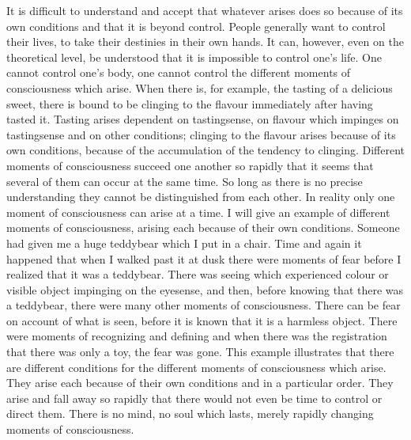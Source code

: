 \documentclass{book}
\begin{document}
It is difficult to understand and accept that whatever arises does so
because of its own conditions and that it is beyond control. People
generally want to control their lives, to take their destinies in their
own hands. It can, however, even on the theoretical level, be understood
that it is impossible to control one's life. One cannot control one's
body, one cannot control the different moments of consciousness which
arise. When there is, for example, the tasting of a delicious sweet,
there is bound to be clinging to the flavour immediately after having
tasted it. Tasting arises dependent on tastingsense, on flavour which
impinges on tastingsense and on other conditions; clinging to the
flavour arises because of its own conditions, because of the
accumulation of the tendency to clinging. Different moments of
consciousness succeed one another so rapidly that it seems that several
of them can occur at the same time. So long as there is no precise
understanding they cannot be distinguished from each other. In reality
only one moment of consciousness can arise at a time. I will give an
example of different moments of consciousness, arising each because of
their own conditions. Someone had given me a huge teddybear which I put
in a chair. Time and again it happened that when I walked past it at
dusk there were moments of fear before I realized that it was a
teddybear. There was seeing which experienced colour or visible object
impinging on the eyesense, and then, before knowing that there was a
teddybear, there were many other moments of conscious­ness. There can be
fear on account of what is seen, before it is known that it is a
harmless object. There were moments of recognizing and defining and when
there was the registration that there was only a toy, the fear was gone.
This example illustrates that there are different conditions for the
different moments of consciousness which arise. They arise each because
of their own conditions and in a particular order. They arise and fall
away so rapidly that there would not even be time to control or direct
them. There is no mind, no soul which lasts, merely rapidly changing
moments of consciousness.
\end{document}
